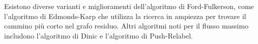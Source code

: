 Esistono diverse varianti e miglioramenti dell'algoritmo di Ford-Fulkerson, come l'algoritmo di Edmonds-Karp che utilizza la ricerca in ampiezza per trovare il cammino più corto nel grafo residuo. Altri algoritmi noti per il flusso massimo includono l'algoritmo di Dinic e l'algoritmo di Push-Relabel.




%
%
%
%
%
%
